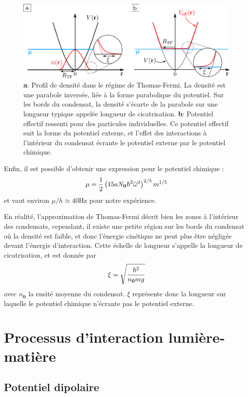 \begin{figure}
\centering
\includegraphics[width=\textwidth]{Fig/BEC_manip/thomas_fermi.pdf}
\caption{\textbf{a}: Profil de densité dans le régime de Thomas-Fermi. La densité est une parabole inversée, liée à la forme parabolique du potentiel. Sur les bords du condensat, la densité s'écarte de la parabole sur une longueur typique appelée longueur de cicatrisation. \textbf{b}: Potentiel effectif ressenti pour des particules individuelles. Ce potentiel effectif suit la forme du potentiel externe, et l'effet des interactions à l'intérieur du condensat écrante le potentiel externe par le potentiel chimique.}
\label{fig:thomas_fermi}
\end{figure}
Enfin, il est possible d'obtenir une expression pour le potentiel chimique \citep{pethick2008bose}: 
\begin{equation}
\mu=\frac{1}{2} \left( 15a N_{\mathbf{0}} \hslash^2 \overline{\omega}^3 \right) ^{2/5} m^{1/5}
\end{equation}
et vaut environ $\mu/h\approx40$Hz pour notre expérience.

En réalité, l'approximation de Thomas-Fermi décrit bien les zones à l'intérieur des condensats, cependant, il existe une petite région sur les bords du condensat où la densité est faible, et donc l'énergie cinétique ne peut plus être négligée devant l'énergie d'interaction. Cette échelle de longueur s'appelle la longueur de cicatrisation, et est donnée par 
\begin{equation}
\xi=\sqrt{\frac{\hslash^2}{n_{\mathbf{0}} mg}}
\end{equation}
avec $n_{\mathbf{0}}$ la ensité moyenne du condensat. $\xi$ représente donc la longueur sur laquelle le potentiel chimique n'écrante pas le potentiel externe.


\section{Processus d'interaction lumière-matière} 
\subsection{Potentiel dipolaire}
